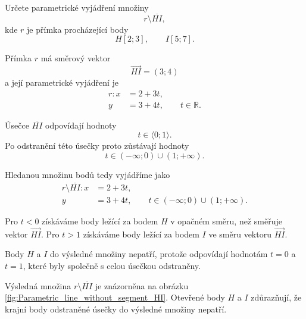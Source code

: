 \begin{example}\label{exa:Parametric_line_without_segment_between_points}
    Určete parametrické vyjádření množiny
    \[
        r\setminus\overline{HI},
    \]
    kde $r$ je přímka procházející body
    \[
        H[2;3],\qquad I[5;7].
    \]

    Přímka $r$ má směrový vektor
    \[
        \overrightarrow{HI}=(3;4)
    \]
    a její parametrické vyjádření je
    \begin{align*}
        r: x &= 2+3t,\\
           y &= 3+4t,
           \qquad t\in\mathbb{R}.
    \end{align*}

    Úsečce $\overline{HI}$ odpovídají hodnoty
    \[
        t\in\langle0;1\rangle.
    \]
    Po odstranění této úsečky proto zůstávají hodnoty
    \[
        t\in(-\infty;0)\cup(1;+\infty).
    \]

    Hledanou množinu bodů tedy vyjádříme jako
    \begin{align*}
        r\setminus\overline{HI}: x &= 2+3t,\\
                                   y &= 3+4t,
                                   \qquad
                                   t\in(-\infty;0)\cup(1;+\infty).
    \end{align*}

    Pro $t<0$ získáváme body ležící za bodem $H$ v opačném směru,
    než směřuje vektor $\overrightarrow{HI}$. Pro $t>1$ získáváme
    body ležící za bodem $I$ ve směru vektoru
    $\overrightarrow{HI}$.

    Body $H$ a $I$ do výsledné množiny nepatří, protože odpovídají
    hodnotám $t=0$ a $t=1$, které byly společně s celou úsečkou
    odstraněny.

    Výsledná množina $r\setminus\overline{HI}$ je znázorněna na obrázku \ref{fig:Parametric_line_without_segment_HI}.
    Otevřené body $H$ a $I$ zdůrazňují, že krajní body odstraněné úsečky do výsledné množiny nepatří.
\end{example}

